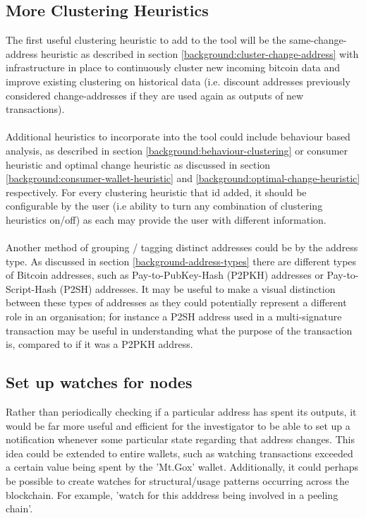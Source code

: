 \subsection{More Clustering Heuristics}
The first useful clustering heuristic to add to the tool will be the same-change-address heuristic as described in section \ref{background:cluster-change-address} with infrastructure in place to continuously cluster new incoming bitcoin data and improve existing clustering on historical data (i.e. discount addresses previously considered change-addresses if they are used again as outputs of new transactions). 
\\\\
Additional heuristics to incorporate into the tool could include behaviour based analysis, as described in section \ref{background:behaviour-clustering} or consumer heuristic and optimal change heuristic as discussed in section 
\ref{background:consumer-wallet-heuristic} and \ref{background:optimal-change-heuristic} respectively. For every clustering heuristic that id added, it should be configurable by the user (i.e ability to turn any combination of clustering heuristics on/off) as each may provide the user with different information. 
\\\\
Another method of grouping / tagging distinct addresses could be by the address type. As discussed in section \ref{background-address-types} there are different types of Bitcoin addresses, such as Pay-to-PubKey-Hash (P2PKH) addresses or Pay-to-Script-Hash (P2SH) addresses. It may be useful to make a visual distinction between these types of addresses as they could potentially represent a different role in an organisation; for instance a P2SH address used in a multi-signature transaction may be useful in understanding what the purpose of the transaction is, compared to if it was a P2PKH address. 

\subsection{Set up watches for nodes}
Rather than periodically checking if a particular address has spent its outputs, it would be far more useful and efficient for the investigator to be able to set up a notification whenever some particular state regarding that address changes. This idea could be extended to entire wallets, such as watching transactions exceeded a certain value being spent by the 'Mt.Gox' wallet. Additionally, it could perhaps be possible to create watches for structural/usage patterns occurring across the blockchain. For example, 'watch for this adddress being involved in a peeling chain'. 

